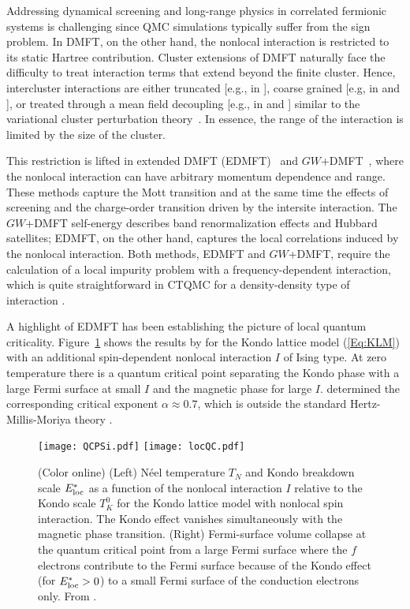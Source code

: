 \documentclass[rmp,aps,reprint,amsmath,amssymb,superscriptaddress,showpacs,nofootinbib]{revtex4-1}
\begin{document}
Addressing dynamical screening and long-range physics in correlated fermionic systems is challenging since QMC simulations typically suffer from the sign problem. In DMFT, on the other hand, the nonlocal interaction is restricted to its static Hartree contribution. Cluster extensions of DMFT naturally face the difficulty to treat interaction terms that extend beyond the finite cluster. Hence, intercluster interactions  are either truncated [e.g., in ], coarse grained [e.g, in  and ], or treated through a mean field decoupling [e.g., in  and ] similar to the variational cluster perturbation theory~\cite{Aichhorn07}. In essence, the range of the interaction is limited by the size of the cluster.

This restriction is lifted in extended DMFT (EDMFT)~\cite{Si1996,Kajueter96,Smith00,Chitra00,Chitra01,Sengupta1995} and $GW$+DMFT~\cite{Sun02,Biermann2003,Sun2004}, where the nonlocal interaction can have arbitrary momentum dependence and range. These methods capture the Mott transition and at the same time the effects of screening and the charge-order transition driven by the intersite interaction. The $GW$+DMFT self-energy describes band renormalization effects and Hubbard satellites; EDMFT, on the other hand, captures the local correlations induced by the nonlocal interaction. Both methods, EDMFT and $GW$+DMFT, require the calculation of a local impurity problem with a frequency-dependent interaction, which is quite straightforward in CTQMC for a density-density type of interaction \cite{Werner07,Werner10}. 

A highlight of EDMFT has been establishing the picture of local quantum criticality. Figure~\ref{fig:locQC} shows the results by  for the Kondo lattice model (\ref{Eq:KLM}) with an additional spin-dependent nonlocal interaction $I$ of Ising type. At zero temperature there is a quantum critical point separating  the Kondo phase with a large Fermi surface at small  $I$ and the magnetic phase for large $I$.  determined the corresponding critical exponent $\alpha\approx 0.7$, which is outside the standard Hertz-Millis-Moriya theory \cite{Loehneysen2007}.

\begin{figure}[tb]
\begin{center}
  \texttt{[image: QCPSi.pdf]}  \hfill
  \texttt{[image: locQC.pdf]}  
    \caption{(Color online) (Left) N\'eel temperature $T_N$ and Kondo breakdown scale $E^*_{\rm loc}$ as a function of the nonlocal interaction  $I$ relative to the Kondo scale $T_K^0$ for the Kondo lattice model with nonlocal spin interaction. The Kondo effect vanishes simultaneously with the magnetic phase transition. (Right) Fermi-surface volume collapse at the quantum critical point from a large Fermi surface where the $f$ electrons contribute to the Fermi surface because of the Kondo effect (for $E^*_{\rm loc}>0$) to a small Fermi surface  of the conduction electrons only.  From .}
  \label{fig:locQC}
\end{center}
\end{figure}
\end{document}
